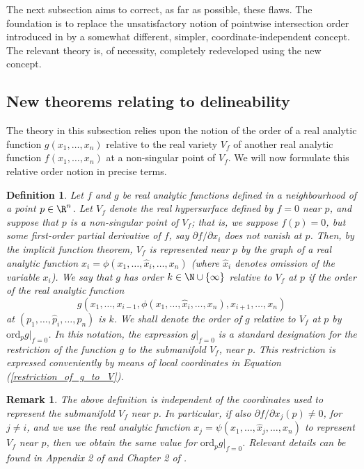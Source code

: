 \documentclass{article}
\newtheorem{definition}{Definition}
\newtheorem{remark}{Remark}
\begin{document}
The next subsection aims to correct, as far as possible, these flaws.
The foundation is to replace the unsatisfactory notion of
pointwise intersection order introduced in \cite{MNDS20} by a somewhat different, simpler, coordinate-independent concept. 
The relevant theory is, of necessity,
completely redeveloped using the new concept.

\subsection{New theorems relating to delineability}
The theory in this subsection relies upon the notion of the order of a real analytic function $g(x_1, \ldots, x_n)$ relative to the real variety $V_f$ of another real analytic function $f(x_1, \ldots, x_n)$ at a non-singular point of $V_f$. We will now formulate this relative order notion in precise terms.

\begin{definition}
    Let $f$ and $g$ be real analytic functions defined in a neighbourhood of a point $p \in \R^n$. Let $V_f$ denote the real hypersurface defined by $f = 0$ near $p$, and suppose that $p$ is a non-singular point of $V_f$; that is, we suppose $f(p) = 0$, but some first-order partial derivative of $f$, say $\partial f/\partial x_i$ does not vanish at $p$. Then, by the implicit function theorem, $V_f$ is represented near $p$ by the graph of a real analytic function
    $x_i = \phi(x_1, \ldots, \hat{x}_i, \ldots, x_n)$ (where $\hat{x}_i$ denotes omission of the variable $x_i$). We say that $g$ has
    order $k \in \N \cup \{\infty\}$ relative to $V_f$ at $p$ if the order of the real analytic function 
\begin{equation}
\label{restriction_of_g_to_V}
    g(x_1, \ldots, x_{i-1}, \phi(x_1, \ldots, \hat{x}_i, \ldots, x_n),
        x_{i+1}, \ldots, x_n)
\end{equation}
    at $(p_1, \ldots, \hat{p}_i, \ldots, p_n)$ is $k$.
    We shall denote the order of $g$ relative to $V_f$ at $p$
    by $\mathrm{ord}_p g|_{f=0}$.
    In this notation, the expression $g|_{f=0}$ is a standard designation
    for the {\em restriction} of the function $g$ to the submanifold $V_f$, near $p$.  This restriction is expressed conveniently by means of local coordinates in Equation (\ref{restriction_of_g_to_V}).
\end{definition}

\begin{remark}
    The above definition is independent of the coordinates used to represent the submanifold $V_f$ near $p$. In particular, if also $\partial f/\partial x_j (p) \neq 0$, for $j \neq i$, and we use the real analytic function
    $x_j = \psi(x_1, \ldots, \hat{x}_j, \ldots, x_n)$ to represent
    $V_f$ near $p$, then we obtain the same value for
    $\mathrm{ord}_p g|_{f=0}$. Relevant details can be found in Appendix 2 of \cite{Whitney1972} and Chapter 2 of \cite{McCallum1985}.
\end{remark}
\end{document}
